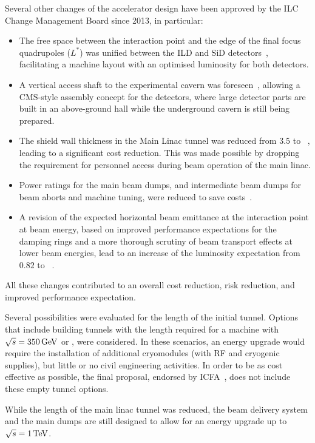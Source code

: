 Several other changes of the accelerator design have been approved by the ILC Change Management Board since 2013, in particular:
\begin{itemize}
\item The free space between the interaction point and the edge of the final focus quadrupoles ($L^*$) was unified between the ILD and SiD detectors~\cite{bib:cr-0002}, facilitating a machine layout with an optimised luminosity for both detectors. 
\item A vertical access shaft to the experimental cavern was foreseen~\cite{bib:cr-0003}, allowing a CMS-style assembly concept for the detectors, where large detector parts are built in an above-ground hall while the underground cavern is still being prepared. 
\item The shield wall thickness in the Main Linac tunnel was reduced from $3.5$ to ~\cite{bib:cr-0012}, leading to a significant cost reduction. This was made possible by dropping the requirement for personnel access during beam operation of the main linac.
\item Power ratings for the main beam dumps, and intermediate beam dumps for beam aborts and machine tuning, were reduced to save costs~\cite{bib:cr-0013}.
\item A revision of the expected horizontal beam emittance at the interaction point at  beam energy, based on improved performance expectations for the damping rings and a more thorough scrutiny of beam transport effects at lower beam energies, lead to an increase of the luminosity expectation from $0.82$ to ~\cite{bib:cr-0016}.
\end{itemize}

All these changes contributed to an overall cost reduction, risk reduction, and improved performance expectation.

Several possibilities were evaluated for the length of the initial tunnel. 
Options that include building tunnels with the length required for a machine with $\sqrt{s} = 350\,{\mathrm{GeV}}$ or , were considered.
In these scenarios, an energy upgrade would require the installation of additional cryomodules (with RF and cryogenic supplies), but little or no civil engineering activities.
In order to be as cost effective as possible, the final proposal, endorsed by ICFA~\cite{ICFA:2017}, does not include these empty tunnel options. 

While the length of the main linac tunnel was reduced, the beam delivery system and the main dumps are still designed to allow for an energy upgrade up to  $\sqrt{s} = 1\,{\mathrm{TeV}}$.


